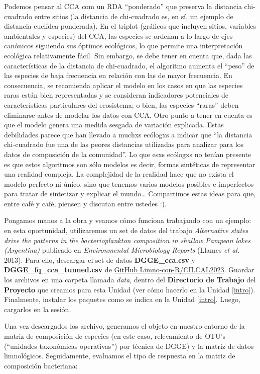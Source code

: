\documentclass[
]{book}
\begin{document}
Podemos pensar al CCA com un RDA ``ponderado'' que preserva la distancia chi-cuadrado entre sitios (la distancia de chi-cuadrado es, en sí, un ejemplo de distancia euclídea ponderada). En el triplot (gráficos que incluyen sitios, variables ambientales y especies) del CCA, las especies se ordenan a lo largo de ejes canónicos siguiendo sus óptimos ecológicos, lo que permite una interpretación ecológica relativamente fácil. Sin embargo, se debe tener en cuenta que, dada las características de la distancia de chi-cuadrado, el algoritmo aumenta el ``peso'' de las especies de baja frecuencia en relación con las de mayor frecuencia. En consecuencia, se recomienda aplicar el modelo en los casos en que las especies raras están bien representadas y se consideran indicadores potenciales de características particulares del ecosistema; o bien, las especies ``raras'' deben eliminarse antes de modelar los datos con CCA. Otro punto a tener en cuenta es que el modelo genera una medida sesgada de variación explicada. Estas debilidades parece que han llevado a muchxs ecólogxs a indicar que ``la distancia chi-cuadrado fue una de las peores distancias utilizadas para analizar para los datos de composición de la comunidad''. Lo que esxs ecólogxs no tenían presente es que estos algoritmos son sólo modelos es decir, formas sintéticas de representar una realidad compleja. La complejidad de la realidad hace que no exista el modelo perfecto ni único, sino que tenemos varios modelos posibles e imperfectos para tratar de sintetizar y explicar el mundo\ldots{} Compartimos estas ideas para que, entre café y café, piensen y discutan entre ustedes :).

Pongamos manos a la obra y veamos cómo funciona trabajando con un ejemplo: en esta oportunidad, utilizaremos un set de datos del trabajo \emph{Alternative states drive the patterns in the bacterioplankton composition in shallow Pampean lakes (Argentina)} publicado en \emph{Environmental Microbiology Reports} (Llames \emph{et al.} 2013). Para ello, descargar el set de datos \textbf{DGGE\_cca.csv} y \textbf{DGGE\_fq\_cca\_tunned.csv} de \href{https://github.com/Limno-con-R/CILCAL2023/tree/main/datasets}{GitHub Limno-con-R/CILCAL2023}.
Guardar los archivos en una carpeta llamada \emph{data}, dentro del \textbf{Directorio de Trabajo} del \textbf{Proyecto} que creamos para esta Unidad (ver cómo hacerlo en la Unidad \ref{intro}). Finalmente, instalar los paquetes como se indica en la Unidad \ref{intro}. Luego, cargarlos en la sesión.

Una vez descargados los archivo, generamos el objeto en nuestro entorno de la matriz de composición de especies (en este caso, relevamiento de OTU's (``unidades taxonómicas operativas'') por técnica de DGGE) y la matriz de datos limnológicos. Seguidamente, evaluamos el tipo de respuesta en la matriz de composición bacteriana:
\end{document}
